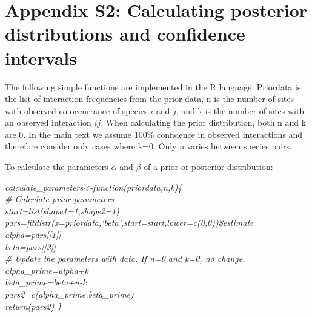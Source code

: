 \documentclass[12pt]{article}
\begin{document}

\clearpage


\section*{Appendix S2: Calculating posterior distributions and confidence intervals}

  The following simple functions are implemented in the R language. 
  Priordata is the list of interaction frequencies from the prior 
  data, n is the number of sites with observed co-occurrance of 
  species $i$ and $j$, and k is the number of sites with an 
  observed interaction $ij$. When calculating the prior 
  distribution, both n and k are 0. In the main text we assume 100\%
  confidence in observed interactions and therefore consider only 
  cases where k=0. Only n varies between species pairs.


  To calculate the parameters $\alpha$ and $\beta$ of a prior or 
  posterior distribution:

  \vspace{12pt}
  \emph{
  \noindent \hspace{-4pt}calculate\_parameters\textless-function(priordata,n,k)\{\\
  \hspace{4pt} \# Calculate prior parameters\\
  \hspace{4pt} start=list(shape1=1,shape2=1)
  \hspace{80pt} pars=fitdistr(x=priordata,`beta',start=start,lower=c(0,0))\$estimate\\
  \hspace{4pt} alpha=pars[[1]]\\
  \hspace{4pt} beta=pars[[2]]\\
  \hspace{4pt} \# Update the parameters with data. If n=0 and k=0, no change.\\
  \hspace{4pt} alpha\_prime=alpha+k\\
  \hspace{4pt} beta\_prime=beta+n-k\\
  \hspace{4pt} pars2=c(alpha\_prime,beta\_prime)\\
  \hspace{4pt} return(pars2) \}
  }
  \vspace{12pt}
\end{document}
